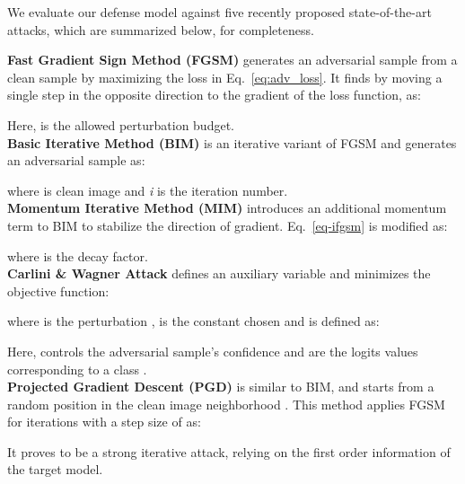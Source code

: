 \documentclass[10pt,twocolumn,letterpaper]{article}
\begin{document}
We evaluate our defense model against five recently proposed state-of-the-art attacks, which are summarized below, for completeness.\medskip  \\
\vspace{-1.0em}


\noindent \textbf{Fast Gradient Sign Method (FGSM)} \cite{43405} generates an adversarial sample  from a clean sample  by maximizing the loss in Eq.~\ref{eq:adv_loss}. It finds  by moving a single step in the opposite direction to the gradient of the loss function, as:
\vspace{-0.7em}

Here,  is the allowed perturbation budget. \medskip \\ 
\textbf{Basic Iterative Method (BIM)} \cite{kurakin2016adversarial} is an iterative variant of FGSM and generates an adversarial sample as:
\vspace{-0.75em}

where  is clean image  and \textit{i} is the iteration number. \medskip \\ 
\textbf{Momentum Iterative Method (MIM)} \cite{dong2018boosting} introduces an additional momentum term to BIM to stabilize the direction of gradient. Eq.\ \ref{eq-ifgsm} is modified as:
\vspace{-0.75em}

\vspace{-0.75em}

where  is the decay factor. \medskip \\
\textbf{Carlini \& Wagner Attack} \cite{carlini2017towards} defines an auxiliary variable  and minimizes the objective function:
\vspace{-0.75em}

where  is the perturbation ,  is the constant chosen and  is defined as:
\vspace{-0.25em}

Here,  controls the adversarial sample's confidence and  are the logits values corresponding to a class .\medskip \\
\textbf{Projected Gradient Descent (PGD)} \cite{madry2017towards} is similar to BIM, and starts from a random position in the clean image neighborhood . This method applies FGSM for  iterations with a step size of  as:
\vspace{-0.57em}

It proves to be a strong iterative attack, relying on the first order information of the target model.

\vspace{-0.25em}
\end{document}
